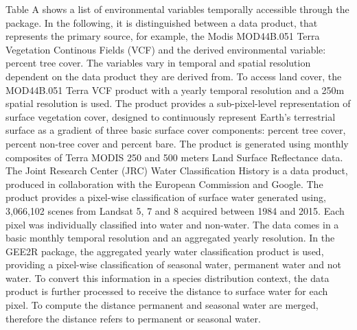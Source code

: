 \documentclass[11pt,twoside,a4paper,final]{report}
\begin{document}
Table A shows a list of environmental variables temporally accessible through the package. In the following, it is distinguished between a data product, that represents the primary source, for example, the Modis MOD44B.051 Terra Vegetation Continous Fields (VCF) and the derived environmental variable: percent tree cover.
The variables vary in temporal and spatial resolution dependent on the data product they are derived from. 
To access land cover, the MOD44B.051 Terra VCF product with a yearly temporal resolution and a 250m spatial resolution is used. The product provides a sub-pixel-level representation of surface vegetation cover, designed to continuously represent Earth's terrestrial surface as a gradient of three basic surface cover components: percent tree cover, percent non-tree cover and percent bare. The product is generated using monthly composites of Terra MODIS 250 and 500 meters Land Surface Reflectance data.
The Joint Research Center (JRC) Water Classification History is a data product, produced in collaboration with the European Commission and Google. The product provides a pixel-wise classification of surface water generated using, 3,066,102 scenes from Landsat 5, 7 and 8 acquired between 1984 and 2015. Each pixel was individually classified into water and non-water. The data comes in a basic monthly temporal resolution and an aggregated yearly resolution. In the GEE2R package, the aggregated yearly water classification product is used, providing a pixel-wise classification of seasonal water, permanent water and not water. To convert this information in a species distribution context, the data product is further processed to receive the distance to surface water for each pixel. To compute the distance permanent and seasonal water are merged, therefore the distance refers to permanent or seasonal water.
\end{document}
